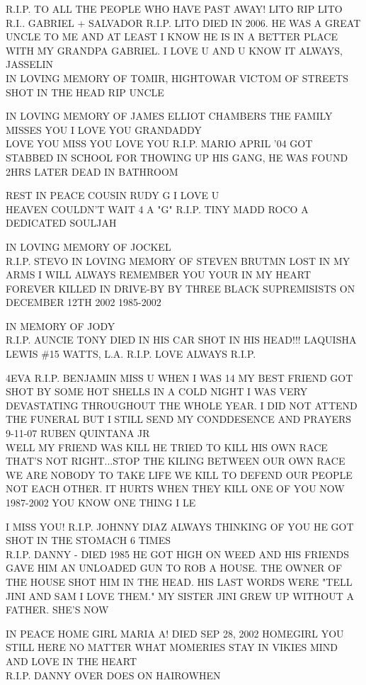 \documentclass[10pt,letterpaper]{article}
\begin{document}
R.I.P. TO ALL THE PEOPLE WHO HAVE PAST AWAY!  LITO RIP LITO R.I.. GABRIEL + SALVADOR R.I.P. LITO DIED IN 2006.  HE WAS A GREAT UNCLE TO ME AND AT LEAST I KNOW HE IS IN A BETTER PLACE WITH MY GRANDPA GABRIEL.  I LOVE U AND U KNOW IT ALWAYS, JASSELIN\\
IN LOVING MEMORY OF TOMIR, HIGHTOWAR VICTOM OF STREETS SHOT IN THE HEAD RIP UNCLE

IN LOVING MEMORY OF JAMES ELLIOT CHAMBERS THE FAMILY MISSES YOU I LOVE YOU GRANDADDY\\
LOVE YOU MISS YOU LOVE YOU R.I.P. MARIO APRIL '04 GOT STABBED IN SCHOOL FOR THOWING UP HIS GANG, HE WAS FOUND 2HRS LATER DEAD IN BATHROOM

REST IN PEACE COUSIN RUDY G I LOVE U\\
HEAVEN COULDN'T WAIT 4 A "G" R.I.P. TINY MADD ROCO A DEDICATED SOULJAH

IN LOVING MEMORY OF JOCKEL\\
R.I.P. STEVO IN LOVING MEMORY OF STEVEN BRUTMN LOST IN MY ARMS I WILL ALWAYS REMEMBER YOU YOUR IN MY HEART FOREVER KILLED IN DRIVE{-}BY BY THREE BLACK SUPREMISISTS ON DECEMBER 12TH 2002 1985{-}2002

IN MEMORY OF JODY\\
R.I.P. AUNCIE TONY DIED IN HIS CAR SHOT IN HIS HEAD!!! LAQUISHA LEWIS \#15 WATTS, L.A. R.I.P. LOVE ALWAYS R.I.P.

4EVA R.I.P. BENJAMIN MISS U WHEN I WAS 14 MY BEST FRIEND GOT SHOT BY SOME HOT SHELLS IN A COLD NIGHT I WAS VERY DEVASTATING THROUGHOUT THE WHOLE YEAR.  I DID NOT ATTEND THE FUNERAL BUT I STILL SEND MY CONDDESENCE AND PRAYERS 9{-}11{-}07 RUBEN QUINTANA JR\\
WELL MY FRIEND WAS KILL HE TRIED TO KILL HIS OWN RACE THAT'S NOT RIGHT...STOP THE KILING BETWEEN OUR OWN RACE WE ARE NOBODY TO TAKE LIFE WE KILL TO DEFEND OUR PEOPLE NOT EACH OTHER.  IT HURTS WHEN THEY KILL ONE OF YOU NOW 1987{-}2002 YOU KNOW ONE THING I LE

I MISS YOU!  R.I.P. JOHNNY DIAZ ALWAYS THINKING OF YOU HE GOT SHOT IN THE STOMACH 6 TIMES\\
R.I.P. DANNY {-} DIED 1985 HE GOT HIGH ON WEED AND HIS FRIENDS GAVE HIM AN UNLOADED GUN TO ROB A HOUSE.  THE OWNER OF THE HOUSE SHOT HIM IN THE HEAD.  HIS LAST WORDS WERE "TELL JINI AND SAM I LOVE THEM."  MY SISTER JINI GREW UP WITHOUT A FATHER.  SHE'S NOW

IN PEACE HOME GIRL MARIA A!  DIED SEP 28, 2002 HOMEGIRL YOU STILL HERE NO MATTER WHAT MOMERIES STAY IN VIKIES MIND AND LOVE IN THE HEART\\
R.I.P. DANNY OVER DOES ON HAIROWHEN
\end{document}
